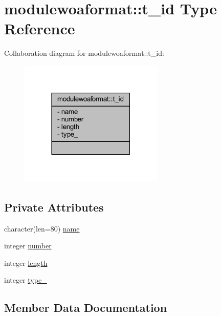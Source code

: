 \hypertarget{structmodulewoaformat_1_1t__id}{}\section{modulewoaformat\+:\+:t\+\_\+id Type Reference}
\label{structmodulewoaformat_1_1t__id}


Collaboration diagram for modulewoaformat\+:\+:t\+\_\+id\+:\nopagebreak
\begin{figure}[H]
\begin{center}
\leavevmode
\includegraphics[width=194pt]{structmodulewoaformat_1_1t__id__coll__graph}
\end{center}
\end{figure}
\subsection*{Private Attributes}
\begin{DoxyCompactItemize}
\item 
character(len=80) \mbox{\hyperlink{structmodulewoaformat_1_1t__id_abbdbd96dacae419acedf8530a7f640f3}{name}}
\item 
integer \mbox{\hyperlink{structmodulewoaformat_1_1t__id_abf3b2219af862ba9e3ff21d599e4c17c}{number}}
\item 
integer \mbox{\hyperlink{structmodulewoaformat_1_1t__id_a10ec6c92e2f9b798ad2a4fad882d4d37}{length}}
\item 
integer \mbox{\hyperlink{structmodulewoaformat_1_1t__id_a4000a55da1b2fd57c2848f11c61543d4}{type\+\_\+}}
\end{DoxyCompactItemize}


\subsection{Member Data Documentation}
\mbox{\label{structmodulewoaformat_1_1t__id_a10ec6c92e2f9b798ad2a4fad882d4d37}} 

